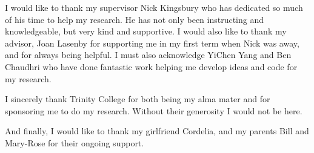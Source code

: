 
\begin{acknowledgements}

  I would like to thank my supervisor Nick Kingsbury who has dedicated so
  much of his time to help my research. He has not only been instructing and
  knowledgeable, but very kind and supportive. I would also like to thank my
  advisor, Joan Lasenby for supporting me in my first term when Nick was away,
  and for always being helpful. I must also acknowledge
  YiChen Yang and Ben Chaudhri who have done fantastic work helping me develop
  ideas and code for my research.

  I sincerely thank Trinity College for both being my alma mater and
  for sponsoring me to do my research. Without their generosity I would not be
  here.

  And finally, I would like to thank my girlfriend Cordelia, and my parents
  Bill and Mary-Rose for their ongoing support.


\end{acknowledgements}
